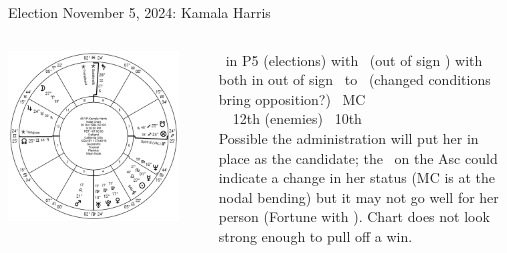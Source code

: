 \begin{frame}[t]{Election November 5, 2024: Kamala Harris}
\small
\begin{columns}[T, onlytextwidth]
\vspace{-1em}
{\includegraphics[width=0.9\textwidth]{charts/Harris.png}}
\fontsize{6pt}{7pt}\selectfont

\Mercury\, in P5 (elections) with \Sun\, (out of sign \Conjunction) with both in out of sign \Opposition\, to \Moon\, (changed conditions bring opposition?) \Trine\, MC \\
\Jupiter\, \Conjunction\, 12th (enemies) \Sextile\, 10th \\
\vspace{0.5em}
Possible the administration will put her in place as the candidate; the \NorthNode\, on the Asc could indicate a change in her status (MC is at the nodal bending) but it may not go well for her person (Fortune with \SouthNode). Chart does not look strong enough to pull off a win.


\end{columns}
\end{frame}
